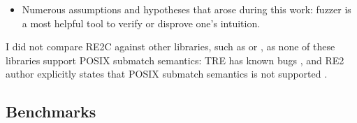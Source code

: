 \documentclass{article}
\theoremstyle{definition}
\begin{document}
\begin{multicols}{2}
\begin{itemize}
        First bug can be triggered by RE \texttt{(((a*)|b)|b)+} and input string \texttt{ab}:
        Regex-TDFA returns incorrect submatch result for second capturing group \texttt{((a*)|b)}
        (no match instead of \texttt{b} at offset 1).
        Some alternative variants that also fail: \texttt{(((a*)|b)|b)\{1,2\}}, \texttt{((b|(a*))|b)+}.

        Second bug can be triggered by RE \texttt{((a?)(())*|a)+} and input string \texttt{aa}.
        Incorrect result is for second group \texttt{(a?)} (no match instead of \texttt{a} at offset 1),
        third group \texttt{(())} and fourth group \texttt{()} (no match instead of empty match at offset 2).
        Alternative variant that also fails: \texttt{((a?()?)|a)+}.

        Tested against Regex-TDFA-1.2.2.

    \item Numerous assumptions and hypotheses that arose during this work:
        fuzzer is a most helpful tool to verify or disprove one's intuition.
    \\
\end{itemize}

I did not compare RE2C against other libraries, such as \cite{TRE} or \cite{RE2},
as none of these libraries support POSIX submatch semantics:
TRE has known bugs \cite{LTU},
and RE2 author explicitly states that POSIX submatch semantics is not supported \cite{Cox17}.

\subsection*{Benchmarks}


\end{multicols}
\end{document}
